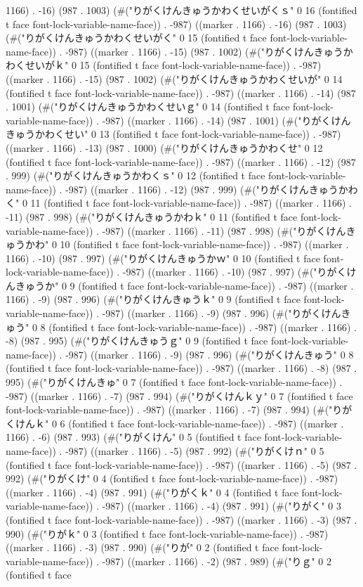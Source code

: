 1166) . -16) (987 . 1003) (#("りがくけんきゅうかわくせいがくｓ" 0 16 (fontified t face font-lock-variable-name-face)) . -987) ((marker . 1166) . -16) (987 . 1003) (#("りがくけんきゅうかわくせいがく" 0 15 (fontified t face font-lock-variable-name-face)) . -987) ((marker . 1166) . -15) (987 . 1002) (#("りがくけんきゅうかわくせいがｋ" 0 15 (fontified t face font-lock-variable-name-face)) . -987) ((marker . 1166) . -15) (987 . 1002) (#("りがくけんきゅうかわくせいが" 0 14 (fontified t face font-lock-variable-name-face)) . -987) ((marker . 1166) . -14) (987 . 1001) (#("りがくけんきゅうかわくせいｇ" 0 14 (fontified t face font-lock-variable-name-face)) . -987) ((marker . 1166) . -14) (987 . 1001) (#("りがくけんきゅうかわくせい" 0 13 (fontified t face font-lock-variable-name-face)) . -987) ((marker . 1166) . -13) (987 . 1000) (#("りがくけんきゅうかわくせ" 0 12 (fontified t face font-lock-variable-name-face)) . -987) ((marker . 1166) . -12) (987 . 999) (#("りがくけんきゅうかわくｓ" 0 12 (fontified t face font-lock-variable-name-face)) . -987) ((marker . 1166) . -12) (987 . 999) (#("りがくけんきゅうかわく" 0 11 (fontified t face font-lock-variable-name-face)) . -987) ((marker . 1166) . -11) (987 . 998) (#("りがくけんきゅうかわｋ" 0 11 (fontified t face font-lock-variable-name-face)) . -987) ((marker . 1166) . -11) (987 . 998) (#("りがくけんきゅうかわ" 0 10 (fontified t face font-lock-variable-name-face)) . -987) ((marker . 1166) . -10) (987 . 997) (#("りがくけんきゅうかｗ" 0 10 (fontified t face font-lock-variable-name-face)) . -987) ((marker . 1166) . -10) (987 . 997) (#("りがくけんきゅうか" 0 9 (fontified t face font-lock-variable-name-face)) . -987) ((marker . 1166) . -9) (987 . 996) (#("りがくけんきゅうｋ" 0 9 (fontified t face font-lock-variable-name-face)) . -987) ((marker . 1166) . -9) (987 . 996) (#("りがくけんきゅう" 0 8 (fontified t face font-lock-variable-name-face)) . -987) ((marker . 1166) . -8) (987 . 995) (#("りがくけんきゅうｇ" 0 9 (fontified t face font-lock-variable-name-face)) . -987) ((marker . 1166) . -9) (987 . 996) (#("りがくけんきゅう" 0 8 (fontified t face font-lock-variable-name-face)) . -987) ((marker . 1166) . -8) (987 . 995) (#("りがくけんきゅ" 0 7 (fontified t face font-lock-variable-name-face)) . -987) ((marker . 1166) . -7) (987 . 994) (#("りがくけんｋｙ" 0 7 (fontified t face font-lock-variable-name-face)) . -987) ((marker . 1166) . -7) (987 . 994) (#("りがくけんｋ" 0 6 (fontified t face font-lock-variable-name-face)) . -987) ((marker . 1166) . -6) (987 . 993) (#("りがくけん" 0 5 (fontified t face font-lock-variable-name-face)) . -987) ((marker . 1166) . -5) (987 . 992) (#("りがくけｎ" 0 5 (fontified t face font-lock-variable-name-face)) . -987) ((marker . 1166) . -5) (987 . 992) (#("りがくけ" 0 4 (fontified t face font-lock-variable-name-face)) . -987) ((marker . 1166) . -4) (987 . 991) (#("りがくｋ" 0 4 (fontified t face font-lock-variable-name-face)) . -987) ((marker . 1166) . -4) (987 . 991) (#("りがく" 0 3 (fontified t face font-lock-variable-name-face)) . -987) ((marker . 1166) . -3) (987 . 990) (#("りがｋ" 0 3 (fontified t face font-lock-variable-name-face)) . -987) ((marker . 1166) . -3) (987 . 990) (#("りが" 0 2 (fontified t face font-lock-variable-name-face)) . -987) ((marker . 1166) . -2) (987 . 989) (#("りｇ" 0 2 (fontified t face 
